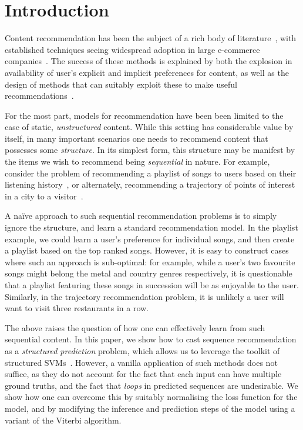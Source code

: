 
\section{Introduction}
\label{sec:intro}

Content recommendation has been the subject of a rich body of literature~\citep{Goldberg:1992,Sarwar:2001,Koren:2010},
with established techniques seeing widespread adoption in large e-commerce companies~\citep{Linden:2003,Agarwal:2013,Amatriain:2015,Gomez-Uribe:2015}.
The success of these methods is explained by both the explosion in availability of user's explicit and implicit preferences for content,
as well as the design of methods that can suitably exploit these to make useful recommendations~\citep{Koren:2009}.

For the most part, models for recommendation have been been limited to the case of static, \emph{unstructured} content.
While this setting has considerable value by itself,
in many important scenarios one needs to recommend content that possesses some \emph{structure}.
In its simplest form, this structure may be manifest by the items we wish to recommend being \emph{sequential} in nature.
For example, consider the problem of recommending a playlist of songs to users based on their listening history~\citep{McFee:2011,chen2012playlist},
or alternately,
recommending a trajectory of points of interest in a city to a visitor~\citep{lu2010photo2trip,lu2012personalized,ijcai15,cikm16paper}.

A na\"{i}ve approach to such sequential recommendation problems is to simply ignore the structure,
and learn a standard recommendation model.
In the playlist example, we could learn a user's preference for individual songs,
and then create a playlist based on the top ranked songs.
However, it is easy to construct cases where such an approach is sub-optimal:
for example, while a user's two favourite songs might belong
the metal and country genres respectively,
it is questionable that a playlist featuring these songs in succession will be as enjoyable to the user.
Similarly, in the trajectory recommendation problem, it is unlikely a user will want to visit three restaurants in a row.

The above raises the question of how one can effectively learn from such sequential content.
In this paper, we show how to cast sequence recommendation as a \emph{structured prediction} problem,
which allows us to leverage the toolkit of structured SVMs~\citep{tsochantaridis2005large}.
However, a vanilla application of such methods does not suffice,
as they do not account for the fact that each input can have multiple ground truths,
and the fact that \emph{loops} in predicted sequences are undesirable.
We show how one can overcome this by
suitably normalising the loss function for the model,
and by modifying the inference and prediction steps of the model using a variant of the Viterbi algorithm.

